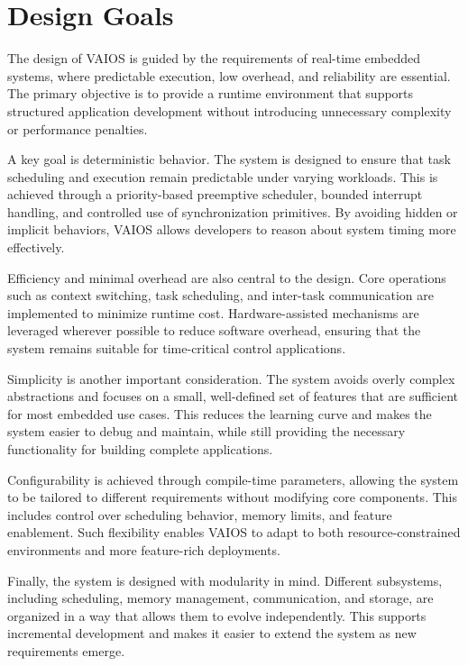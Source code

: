 \section{Design Goals}
\label{sec:vaios_design_goals}

The design of VAIOS is guided by the requirements of real-time embedded systems, where predictable execution, low overhead, and reliability are essential. The primary objective is to provide a runtime environment that supports structured application development without introducing unnecessary complexity or performance penalties.

A key goal is deterministic behavior. The system is designed to ensure that task scheduling and execution remain predictable under varying workloads. This is achieved through a priority-based preemptive scheduler, bounded interrupt handling, and controlled use of synchronization primitives. By avoiding hidden or implicit behaviors, VAIOS allows developers to reason about system timing more effectively.

Efficiency and minimal overhead are also central to the design. Core operations such as context switching, task scheduling, and inter-task communication are implemented to minimize runtime cost. Hardware-assisted mechanisms are leveraged wherever possible to reduce software overhead, ensuring that the system remains suitable for time-critical control applications.

Simplicity is another important consideration. The system avoids overly complex abstractions and focuses on a small, well-defined set of features that are sufficient for most embedded use cases. This reduces the learning curve and makes the system easier to debug and maintain, while still providing the necessary functionality for building complete applications.

Configurability is achieved through compile-time parameters, allowing the system to be tailored to different requirements without modifying core components. This includes control over scheduling behavior, memory limits, and feature enablement. Such flexibility enables VAIOS to adapt to both resource-constrained environments and more feature-rich deployments.

Finally, the system is designed with modularity in mind. Different subsystems, including scheduling, memory management, communication, and storage, are organized in a way that allows them to evolve independently. This supports incremental development and makes it easier to extend the system as new requirements emerge.